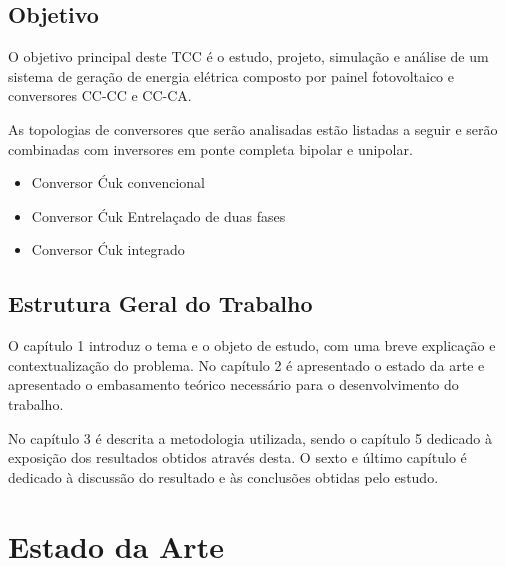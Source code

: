\documentclass[
	12pt,				%
	openright,			%
	onseside,
	a4paper,			%
	english,			%
	french,				%
	spanish,			%
	brazil,				%
	]{abntex2}
\begin{document}
\section{Objetivo}

O objetivo principal deste TCC é o estudo, projeto, simulação e análise de um sistema de geração de energia elétrica composto por painel fotovoltaico e conversores CC-CC e CC-CA. 

As topologias de conversores que serão analisadas estão listadas a seguir e serão combinadas com inversores em ponte completa bipolar e unipolar.

\begin{itemize}
	
	\item Conversor Ćuk convencional
	\item Conversor Ćuk Entrelaçado de duas fases
	\item Conversor Ćuk integrado
	
\end{itemize}

\section{Estrutura Geral do Trabalho}

O capítulo 1 introduz o tema e o objeto de estudo, com uma breve explicação e contextualização do problema. No capítulo 2 é apresentado o estado da arte e apresentado o embasamento teórico necessário para o desenvolvimento do trabalho.

No capítulo 3 é descrita a metodologia utilizada, sendo o capítulo 5 dedicado à exposição dos resultados obtidos através desta. O sexto e último capítulo é dedicado à discussão do resultado e às conclusões obtidas pelo estudo.

\chapter{Estado da Arte}
\end{document}
